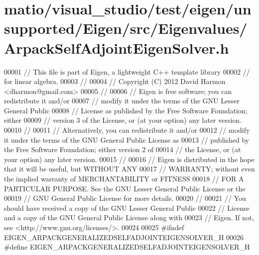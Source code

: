 \hypertarget{matio_2visual__studio_2test_2eigen_2unsupported_2_eigen_2src_2_eigenvalues_2_arpack_self_adjoint_eigen_solver_8h_source}{}\section{matio/visual\+\_\+studio/test/eigen/unsupported/\+Eigen/src/\+Eigenvalues/\+Arpack\+Self\+Adjoint\+Eigen\+Solver.h}
\label{matio_2visual__studio_2test_2eigen_2unsupported_2_eigen_2src_2_eigenvalues_2_arpack_self_adjoint_eigen_solver_8h_source}

\begin{DoxyCode}
00001 \textcolor{comment}{// This file is part of Eigen, a lightweight C++ template library}
00002 \textcolor{comment}{// for linear algebra.}
00003 \textcolor{comment}{//}
00004 \textcolor{comment}{// Copyright (C) 2012 David Harmon <dharmon@gmail.com>}
00005 \textcolor{comment}{//}
00006 \textcolor{comment}{// Eigen is free software; you can redistribute it and/or}
00007 \textcolor{comment}{// modify it under the terms of the GNU Lesser General Public}
00008 \textcolor{comment}{// License as published by the Free Software Foundation; either}
00009 \textcolor{comment}{// version 3 of the License, or (at your option) any later version.}
00010 \textcolor{comment}{//}
00011 \textcolor{comment}{// Alternatively, you can redistribute it and/or}
00012 \textcolor{comment}{// modify it under the terms of the GNU General Public License as}
00013 \textcolor{comment}{// published by the Free Software Foundation; either version 2 of}
00014 \textcolor{comment}{// the License, or (at your option) any later version.}
00015 \textcolor{comment}{//}
00016 \textcolor{comment}{// Eigen is distributed in the hope that it will be useful, but WITHOUT ANY}
00017 \textcolor{comment}{// WARRANTY; without even the implied warranty of MERCHANTABILITY or FITNESS}
00018 \textcolor{comment}{// FOR A PARTICULAR PURPOSE. See the GNU Lesser General Public License or the}
00019 \textcolor{comment}{// GNU General Public License for more details.}
00020 \textcolor{comment}{//}
00021 \textcolor{comment}{// You should have received a copy of the GNU Lesser General Public}
00022 \textcolor{comment}{// License and a copy of the GNU General Public License along with}
00023 \textcolor{comment}{// Eigen. If not, see <http://www.gnu.org/licenses/>.}
00024 
00025 \textcolor{preprocessor}{#ifndef EIGEN\_ARPACKGENERALIZEDSELFADJOINTEIGENSOLVER\_H}
00026 \textcolor{preprocessor}{#define EIGEN\_ARPACKGENERALIZEDSELFADJOINTEIGENSOLVER\_H}

\end{DoxyCode}
